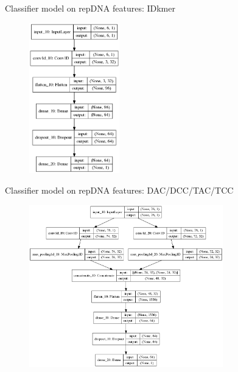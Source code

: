 \documentclass[10pt]{beamer}
\begin{document}
\begin{frame}{Classifier model on repDNA features: IDkmer}
	\begin{figure}[ht]
		\centering
		\includegraphics[width = 0.35\textwidth]{../../models/plotted_models/IDkmer_model.png}
	\end{figure}
\end{frame}

\begin{frame}{Classifier model on repDNA features: DAC/DCC/TAC/TCC}
	\begin{figure}[ht]
		\centering
		\includegraphics[width = 0.75\textwidth]{../../models/plotted_models/dac_model.png}
	\end{figure}
\end{frame}
\end{document}
